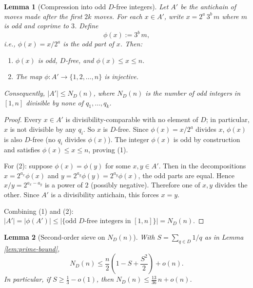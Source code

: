 \documentclass{article}
\newtheorem{lemma}{Lemma}
\begin{document}
\begin{lemma}[Compression into odd $D$-free integers]
\label{lem:compression}
Let $A'$ be the antichain of moves made after the first $2k$ moves. For each $x \in A'$, write $x = 2^{a} \, 3^{b} \, m$ where $m$ is odd and coprime to $3$. Define
\[
\phi(x) := 3^b \, m,
\]
i.e., $\phi(x) = x / 2^a$ is the odd part of $x$. Then:
\begin{enumerate}
  \item $\phi(x)$ is odd, $D$-free, and $\phi(x) \le x \le n$.
  \item The map $\phi : A' \to \{1, 2, \ldots, n\}$ is injective.
\end{enumerate}

Consequently, $|A'| \le N_D(n)$, where $N_D(n)$ is the number of odd integers in $[1, n]$ divisible by none of $q_1, \ldots, q_k$.
\end{lemma}

\begin{proof}
Every $x \in A'$ is divisibility-comparable with no element of $D$; in particular, $x$ is not divisible by any $q_i$. So $x$ is $D$-free. Since $\phi(x) = x/2^a$ divides $x$, $\phi(x)$ is also $D$-free (no $q_i$ divides $\phi(x)$). The integer $\phi(x)$ is odd by construction and satisfies $\phi(x) \le x \le n$, proving (1).

For (2): suppose $\phi(x) = \phi(y)$ for some $x, y \in A'$. Then in the decompositions $x = 2^{a_x} \phi(x)$ and $y = 2^{a_y} \phi(y) = 2^{a_y} \phi(x)$, the odd parts are equal. Hence $x/y = 2^{a_x - a_y}$ is a power of $2$ (possibly negative). Therefore one of $x, y$ divides the other. Since $A'$ is a divisibility antichain, this forces $x = y$.

Combining (1) and (2): $|A'| = |\phi(A')| \le |\{\text{odd } D\text{-free integers in } [1, n]\}| = N_D(n)$.
\end{proof}

\begin{lemma}[Second-order sieve on $N_D(n)$]
\label{lem:sieve}
With $S = \sum_{q \in D} 1/q$ as in Lemma \ref{lem:prime-bound},
\[
N_D(n) \le \frac{n}{2}\!\left(1 - S + \frac{S^2}{2}\right) + o(n).
\]
In particular, if $S \ge \tfrac{1}{3} - o(1)$, then $N_D(n) \le \tfrac{13}{36}\,n + o(n)$.
\end{lemma}
\end{document}
